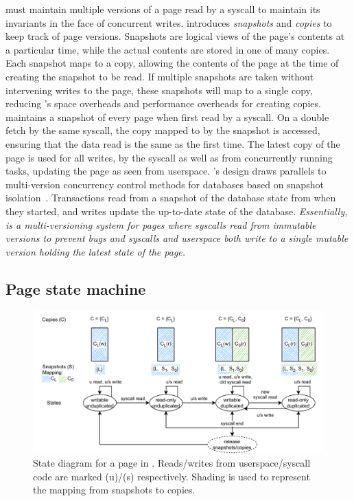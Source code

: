 \documentclass[letterpaper,twocolumn,10pt, anonymous]{article}
\begin{document}
\tiktok must maintain multiple versions of a page read by a syscall 
to maintain its invariants in the face of concurrent writes.
\tiktok introduces \emph{snapshots} and \emph{copies} to keep track 
of page versions. 
Snapshots are logical views of the page's contents at a particular time,
while the actual contents are stored in one of many copies. 
Each snapshot maps to a copy, allowing the contents of the page at the 
time of creating the snapshot to be read. 
If multiple snapshots are taken without intervening writes to the page, 
these snapshots will map to a single copy, reducing \tiktok's space overheads 
and performance overheads for creating copies.
\tiktok maintains a snapshot of every page when first read by a syscall.
On a double fetch by the same syscall, the copy mapped to by the snapshot 
is accessed, ensuring that the data read is the same as the first time.
The latest copy of the page is used for all writes, by the syscall as 
well as from concurrently running tasks, updating the page as seen 
from userspace.
%
\tiktok's design draws parallels to multi-version concurrency control 
methods for databases based on snapshot isolation~\cite{0001MK15}.
Transactions read from a snapshot of the database state from when 
they started, and writes update the up-to-date state of the database.
%
\emph{Essentially, \tiktok is a multi-versioning system for pages where 
syscalls read from immutable versions to prevent \tocttou bugs and
syscalls and userspace both write to a single mutable version 
holding the latest state of the page.}

\subsection{Page state machine}

\begin{figure}[]
  \centering
  \includegraphics[width=0.9\linewidth]{img/tiktok_states.pdf}
  \caption{State diagram for a page in \tiktok. Reads/writes from userspace/syscall 
          code are marked (u)/(s) respectively. Shading is used to represent the 
          mapping from snapshots to copies.}
  \label{fig:tiktok_states}
\end{figure}
\end{document}
